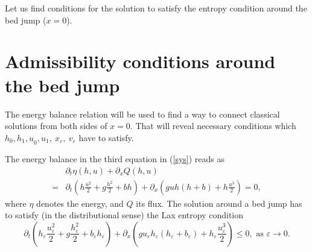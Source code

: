 \documentclass{article}
\theoremstyle{plain}
\theoremstyle{definition}
\theoremstyle{remark}
\begin{document}
Let us find conditions for the solution to satisfy the entropy condition 
around the bed jump ($x=0$). 

\section{Admissibility conditions around the bed jump}

The energy balance relation will be used to find a way to connect
classical solutions from both sides of $x=0$. That will reveal 
necessary conditions which 
\(h_{0}{,h_{1},u}_{0},u_{1},\ x_{\varepsilon},\ v_{\varepsilon}\)
have to satisfy. 

The energy balance in the third equation in (\ref{sys}) reads as
\[
\begin{split}
& \partial_{t} \eta(h,u) + \partial_{x} Q(h,u) \\
= & \partial_{t}\left( h\frac{u^{2}}{2} + g\frac{h^{2}}{2} + bh \right)
+ \partial_{x}\left( guh(h + b) + h\frac{u^{3}}{2} \right) = 0,
\end{split}
\]
where $\eta$ denotes the energy, and $Q$ its flux. 
The solution around a bed jump has to satisfy (in the distributional
sense) the Lax entropy condition
\[
\partial_{t}\left( h_{\varepsilon}\frac{u_{\varepsilon}^{2}}{2} 
+ g\frac{h_{\varepsilon}^{2}}{2} + b_{\varepsilon}h_{\varepsilon} \right) 
+ \partial_{x}\left( gu_{\varepsilon}h_{\varepsilon}\left( h_{\varepsilon} 
+ b_{\varepsilon} \right) + h_{\varepsilon}\frac{u_{\varepsilon}^{3}}{2} \right) 
\leq 0,  \text{ as } \varepsilon \rightarrow 0.
\]
\end{document}

